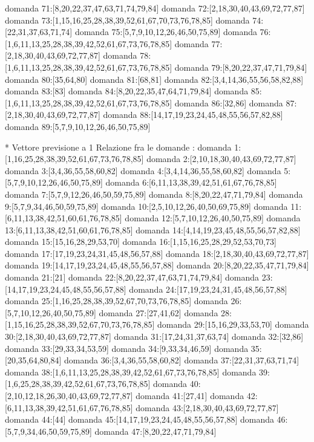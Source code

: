 domanda 71:[8,20,22,37,47,63,71,74,79,84]
domanda 72:[2,18,30,40,43,69,72,77,87]
domanda 73:[1,15,16,25,28,38,39,52,61,67,70,73,76,78,85]
domanda 74:[22,31,37,63,71,74]
domanda 75:[5,7,9,10,12,26,46,50,75,89]
domanda 76:[1,6,11,13,25,28,38,39,42,52,61,67,73,76,78,85]
domanda 77:[2,18,30,40,43,69,72,77,87]
domanda 78:[1,6,11,13,25,28,38,39,42,52,61,67,73,76,78,85]
domanda 79:[8,20,22,37,47,71,79,84]
domanda 80:[35,64,80]
domanda 81:[68,81]
domanda 82:[3,4,14,36,55,56,58,82,88]
domanda 83:[83]
domanda 84:[8,20,22,35,47,64,71,79,84]
domanda 85:[1,6,11,13,25,28,38,39,42,52,61,67,73,76,78,85]
domanda 86:[32,86]
domanda 87:[2,18,30,40,43,69,72,77,87]
domanda 88:[14,17,19,23,24,45,48,55,56,57,82,88]
domanda 89:[5,7,9,10,12,26,46,50,75,89]

* Vettore previsione a 1
Relazione fra le domande :
domanda 1:[1,16,25,28,38,39,52,61,67,73,76,78,85]
domanda 2:[2,10,18,30,40,43,69,72,77,87]
domanda 3:[3,4,36,55,58,60,82]
domanda 4:[3,4,14,36,55,58,60,82]
domanda 5:[5,7,9,10,12,26,46,50,75,89]
domanda 6:[6,11,13,38,39,42,51,61,67,76,78,85]
domanda 7:[5,7,9,12,26,46,50,59,75,89]
domanda 8:[8,20,22,47,71,79,84]
domanda 9:[5,7,9,34,46,50,59,75,89]
domanda 10:[2,5,10,12,26,40,50,69,75,89]
domanda 11:[6,11,13,38,42,51,60,61,76,78,85]
domanda 12:[5,7,10,12,26,40,50,75,89]
domanda 13:[6,11,13,38,42,51,60,61,76,78,85]
domanda 14:[4,14,19,23,45,48,55,56,57,82,88]
domanda 15:[15,16,28,29,53,70]
domanda 16:[1,15,16,25,28,29,52,53,70,73]
domanda 17:[17,19,23,24,31,45,48,56,57,88]
domanda 18:[2,18,30,40,43,69,72,77,87]
domanda 19:[14,17,19,23,24,45,48,55,56,57,88]
domanda 20:[8,20,22,35,47,71,79,84]
domanda 21:[21]
domanda 22:[8,20,22,37,47,63,71,74,79,84]
domanda 23:[14,17,19,23,24,45,48,55,56,57,88]
domanda 24:[17,19,23,24,31,45,48,56,57,88]
domanda 25:[1,16,25,28,38,39,52,67,70,73,76,78,85]
domanda 26:[5,7,10,12,26,40,50,75,89]
domanda 27:[27,41,62]
domanda 28:[1,15,16,25,28,38,39,52,67,70,73,76,78,85]
domanda 29:[15,16,29,33,53,70]
domanda 30:[2,18,30,40,43,69,72,77,87]
domanda 31:[17,24,31,37,63,74]
domanda 32:[32,86]
domanda 33:[29,33,34,53,59]
domanda 34:[9,33,34,46,59]
domanda 35:[20,35,64,80,84]
domanda 36:[3,4,36,55,58,60,82]
domanda 37:[22,31,37,63,71,74]
domanda 38:[1,6,11,13,25,28,38,39,42,52,61,67,73,76,78,85]
domanda 39:[1,6,25,28,38,39,42,52,61,67,73,76,78,85]
domanda 40:[2,10,12,18,26,30,40,43,69,72,77,87]
domanda 41:[27,41]
domanda 42:[6,11,13,38,39,42,51,61,67,76,78,85]
domanda 43:[2,18,30,40,43,69,72,77,87]
domanda 44:[44]
domanda 45:[14,17,19,23,24,45,48,55,56,57,88]
domanda 46:[5,7,9,34,46,50,59,75,89]
domanda 47:[8,20,22,47,71,79,84]
